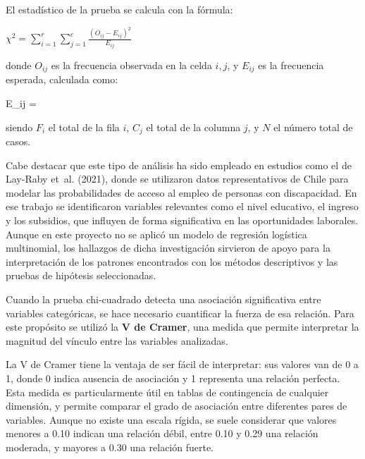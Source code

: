 \documentclass[
  11pt,
  oneside]{article}
\begin{document}
\begin{tcolorbox}[title=Prueba Chi-cuadrado de independencia]
El estadístico de la prueba se calcula con la fórmula:
\begin{center}
$\chi^2 = \sum\limits_{i=1}^r \sum\limits_{j=1}^c \frac{(O_{ij} - E_{ij})^2}{E_{ij}}$
\end{center}
donde \( O_{ij} \) es la frecuencia observada en la celda \( i, j \), y \( E_{ij} \) es la frecuencia esperada, calculada como:

\begin{center}
E_{ij} = 
\end{center}

siendo \( F_i \) el total de la fila \( i \), \( C_j \) el total de la columna \( j \), y \( N \) el número total de casos.
\end{tcolorbox}

Cabe destacar que este tipo de análisis ha sido empleado en estudios
como el de Lay-Raby et~al. (2021), donde se utilizaron datos
representativos de Chile para modelar las probabilidades de acceso al
empleo de personas con discapacidad. En ese trabajo se identificaron
variables relevantes como el nivel educativo, el ingreso y los
subsidios, que influyen de forma significativa en las oportunidades
laborales. Aunque en este proyecto no se aplicó un modelo de regresión
logística multinomial, los hallazgos de dicha investigación sirvieron de
apoyo para la interpretación de los patrones encontrados con los métodos
descriptivos y las pruebas de hipótesis seleccionadas.

Cuando la prueba chi-cuadrado detecta una asociación significativa entre
variables categóricas, se hace necesario cuantificar la fuerza de esa
relación. Para este propósito se utilizó la \textbf{V de Cramer}, una
medida que permite interpretar la magnitud del vínculo entre las
variables analizadas.

La V de Cramer tiene la ventaja de ser fácil de interpretar: sus valores
van de 0 a 1, donde 0 indica ausencia de asociación y 1 representa una
relación perfecta. Esta medida es particularmente útil en tablas de
contingencia de cualquier dimensión, y permite comparar el grado de
asociación entre diferentes pares de variables. Aunque no existe una
escala rígida, se suele considerar que valores menores a 0.10 indican
una relación débil, entre 0.10 y 0.29 una relación moderada, y mayores a
0.30 una relación fuerte.
\end{document}

